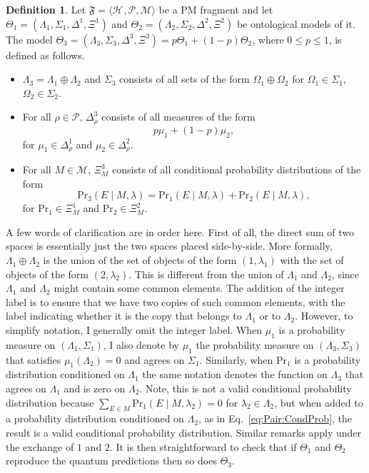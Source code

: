 \documentclass[DIV=calc,fontsize=12pt]{scrartcl} %
\theoremstyle{definition}
\newtheorem{definition}{Definition}[section]
\theoremstyle{plain}
\newcommand{\Hilb}[1][]{\ensuremath{\mathcal{H}_{#1}}}
\begin{document}
\begin{definition}
Let $\mathfrak{F} = \langle \Hilb, \mathcal{P}, \mathcal{M} \rangle$
be a PM fragment and let $\Theta_1 = (\Lambda_1, \Sigma_1, \Delta^1,
\Xi^1)$ and $\Theta_2 = (\Lambda_2, \Sigma_2, \Delta^2, \allowbreak
\Xi^2)$ be ontological models of it.  The model $\Theta_3 =
(\Lambda_3, \Sigma_3, \Delta^3, \Xi^3) = p\Theta_1 + (1-p)\Theta_2$,
where $0 \leq p \leq 1$, is defined as follows.
\begin{itemize}
\item $\Lambda_3 = \Lambda_1 \oplus \Lambda_2$ and $\Sigma_3$
consists of all sets of the form $\Omega_1 \oplus \Omega_2$ for
$\Omega_1 \in \Sigma_1$, $\Omega_2 \in \Sigma_2$.
\item For all $\rho \in \mathcal{P}$, $\Delta^3_{\rho}$ consists of
all measures of the form
\begin{equation}
p \mu_1 + (1-p) \mu_2,
\end{equation}
for $\mu_1 \in \Delta^1_{\rho}$ and $\mu_2 \in \Delta^2_{\rho}$.
\item For all $M \in \mathcal{M}$, $\Xi^3_M$ consists of all
conditional probability distributions of the form
\begin{equation}
\label{eq:Pair:CondProb}
\text{Pr}_3 \left ( E \middle | M, \lambda \right ) =
\text{Pr}_1 \left ( E \middle | M, \lambda \right ) +
\text{Pr}_2 \left ( E \middle | M, \lambda \right ),
\end{equation}
for $\text{Pr}_1 \in \Xi^1_M$ and $\text{Pr}_2 \in \Xi^2_M$.
\end{itemize}
\end{definition}

A few words of clarification are in order here.  First of all, the
direct sum of two spaces is essentially just the two spaces placed
side-by-side.  More formally, $\Lambda_1 \oplus \Lambda_2$ is the
union of the set of objects of the form $(1,\lambda_1)$ with the set
of objects of the form $(2,\lambda_2)$.  This is different from the
union of $\Lambda_1$ and $\Lambda_2$, since $\Lambda_1$ and
$\Lambda_2$ might contain some common elements.  The addition of the
integer label is to ensure that we have two copies of such common
elements, with the label indicating whether it is the copy that
belongs to $\Lambda_1$ or to $\Lambda_2$.  However, to simplify
notation, I generally omit the integer label.  When $\mu_1$ is a
probability measure on $(\Lambda_1,\Sigma_1)$, I also denote by
$\mu_1$ the probability measure on $(\Lambda_3,\Sigma_3)$ that
satisfies $\mu_1(\Lambda_2) = 0$ and agrees on $\Sigma_1$.  Similarly,
when $\text{Pr}_1$ is a probability distribution conditioned on
$\Lambda_1$ the same notation denotes the function on $\Lambda_3$ that
agrees on $\Lambda_1$ and is zero on $\Lambda_2$.  Note, this is not a
valid conditional probability distribution because $\sum_{E \in M}
\text{Pr}_1 \left ( E \middle | M, \lambda_2 \right ) = 0$ for
$\lambda_2 \in \Lambda_2$, but when added to a probability
distribution conditioned on $\Lambda_2$, as in
Eq.~\eqref{eq:Pair:CondProb}, the result is a valid conditional
probability distribution.  Similar remarks apply under the exchange of
$1$ and $2$.  It is then straightforward to check that if $\Theta_1$
and $\Theta_2$ reproduce the quantum predictions then so does
$\Theta_3$.
\end{document}
